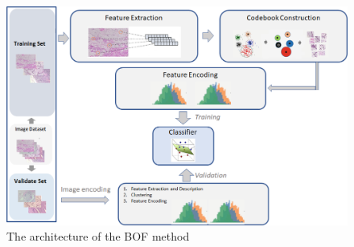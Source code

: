 \begin{figure}
\centering
     \includegraphics[width=1.0\textwidth]{BOVW2}
   \caption[The architecture of the BOF method]{\fontsize{10}{12}\selectfont The architecture of the BOF method}
 \label{ch3:fig:BOF_model}
\end{figure} 


